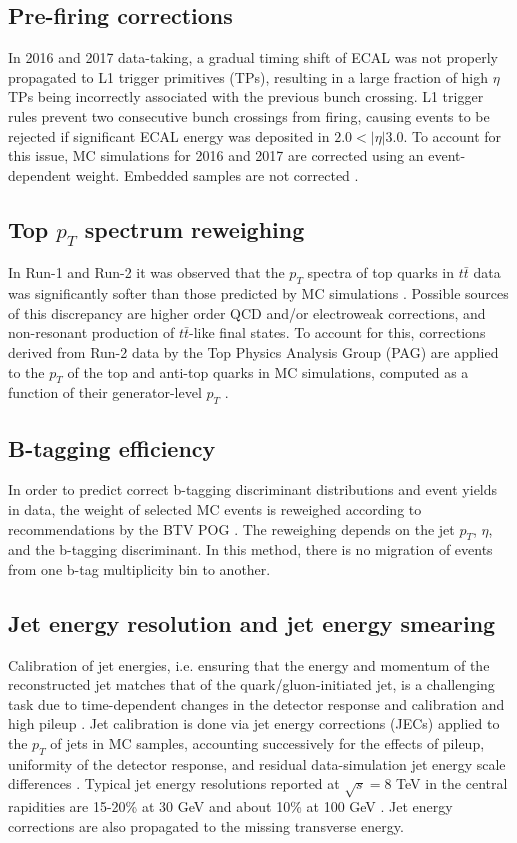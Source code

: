 \subsection{Pre-firing corrections}
In 2016 and 2017 data-taking, a gradual timing shift of ECAL was not properly propagated to L1 trigger primitives (TPs), resulting in a large fraction of high $\eta$ TPs being incorrectly associated with the previous bunch crossing. L1 trigger rules prevent two consecutive bunch crossings from firing, causing events to be rejected if significant ECAL energy was deposited in $2.0 < |\eta| 3.0$. To account for this issue, MC simulations for 2016 and 2017 are corrected using an event-dependent weight. Embedded samples are not corrected \cite{CMS-HIG-19-010}.

\subsection{Top \texorpdfstring{$p_{T}$}{pT} spectrum reweighing}
In Run-1 and Run-2 it was observed that the $p_{T}$ spectra of top quarks in $t\bar{t}$ data was significantly softer than those predicted by MC simulations \cite{twiki_Top_pt_reweighing}. Possible sources of this discrepancy are higher order QCD and/or electroweak corrections, and non-resonant production of $t\bar{t}$-like final states. To account for this, corrections derived from Run-2 data by the Top Physics Analysis Group (PAG) are applied to the $p_{T}$ of the top and anti-top quarks in MC simulations, computed as a function of their generator-level $p_{T}$ \cite{twiki_Top_pt_reweighing}.

\subsection{B-tagging efficiency}
In order to predict correct b-tagging discriminant distributions and event yields in data, the weight of selected MC events is reweighed according to recommendations by the BTV POG \cite{twiki_btag_SF_methods}. The reweighing depends on the jet $p_{T}$, $\eta$, and the b-tagging discriminant. In this method, there is no migration of events from one b-tag multiplicity bin to another.

\subsection{Jet energy resolution and jet energy smearing}
Calibration of jet energies, i.e. ensuring that the energy and momentum of the reconstructed jet matches that of the quark/gluon-initiated jet, is a challenging task due to time-dependent changes in the detector response and calibration and high pileup \cite{CMS-JME-13-004} \cite{proceedings-Agarwal:2022txa}. Jet calibration is done via jet energy corrections (JECs) applied to the $p_{T}$ of jets in MC samples, accounting successively for the effects of pileup, uniformity of the detector response, and residual data-simulation jet energy scale differences \cite{twiki_JetResolution_JEC}. Typical jet energy resolutions reported at $\sqrt{s} = 8$ TeV in the central rapidities are 15-20\% at 30 GeV and about 10\% at 100 GeV \cite{CMS-JME-13-004}. Jet energy corrections are also propagated to the missing transverse energy.

